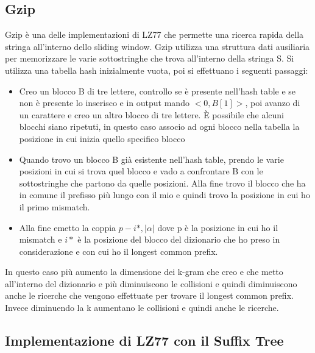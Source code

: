 \documentclass[14pt]{extreport}
\begin{document}
\subsection{Gzip}

Gzip è una delle implementazioni di LZ77 che permette una ricerca rapida della stringa all'interno dello sliding window.
Gzip utilizza una struttura dati ausiliaria per memorizzare le varie sottostringhe che trova all'interno della stringa S.
Si utilizza una tabella hash inizialmente vuota, poi si effettuano i seguenti passaggi:
\begin{itemize}
\item Creo un blocco B di tre lettere, controllo se è presente nell'hash table e se non è presente lo inserisco e in output mando $<0,B[1]>$, poi avanzo di un carattere e creo un altro blocco di tre lettere. È possibile che alcuni blocchi siano ripetuti, in questo caso associo ad ogni blocco nella tabella la posizione in cui inizia quello specifico blocco
\item Quando trovo un blocco B già esistente nell'hash table, prendo le varie posizioni in cui si trova quel blocco e vado a confrontare B con le sottostringhe che partono da quelle posizioni. Alla fine trovo il blocco che ha in comune il prefisso più lungo con il mio e quindi trovo la posizione in cui ho il primo mismatch. 
\item Alla fine emetto la coppia $p-i*, |\alpha|$ dove p è la posizione in cui ho il mismatch e $i*$ è la posizione del blocco del dizionario che ho preso in considerazione e con cui ho il longest common prefix.
\end{itemize}

In questo caso più aumento la dimensione dei k-gram che creo e che metto all'interno del dizionario e più diminuiscono le collisioni e quindi diminuiscono anche le ricerche che vengono effettuate per trovare il longest common prefix. Invece diminuendo la k aumentano le collisioni e quindi anche le ricerche.

\subsection{Implementazione di LZ77 con il Suffix Tree}
\end{document}
